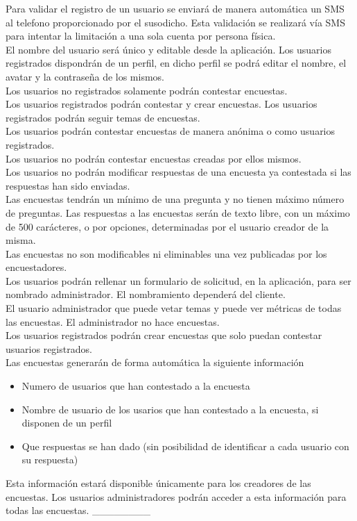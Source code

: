 \documentclass[a4paper,11pt]{report}
\begin{document}
	Para validar el registro de un usuario se enviará de manera automática un SMS al telefono proporcionado por el susodicho. Esta validación se realizará vía SMS para intentar la limitación a una sola cuenta por persona física.
	\\
	El nombre del usuario será único y editable desde la aplicación. Los usuarios registrados dispondrán de un perfil, en dicho perfil se podrá editar el nombre, el avatar y la contraseña de los mismos. 
	\\
	Los usuarios no registrados solamente podrán contestar encuestas. 
	\\
	Los usuarios registrados podrán contestar y crear encuestas. Los usuarios registrados podrán seguir temas de encuestas.
	\\
	Los usuarios podrán contestar encuestas de manera anónima o como usuarios registrados.
	\\
	Los usuarios no podrán contestar encuestas creadas por ellos mismos.
	\\
	Los usuarios no podrán modificar respuestas de una encuesta ya contestada si las respuestas han sido enviadas.
	\\
	Las encuestas tendrán un mínimo de una pregunta y no tienen máximo número de preguntas. Las respuestas a las encuestas serán de texto libre, con un máximo de 500 carácteres, o por opciones, determinadas por el usuario creador de la misma.
	\\
	Las encuestas no son modificables ni eliminables una vez publicadas por los encuestadores.
	\\
	Los usuarios podrán rellenar un formulario de solicitud, en la aplicación, para ser nombrado administrador. El nombramiento dependerá del cliente.
	\\
	El usuario administrador que puede vetar temas y puede ver métricas de todas las encuestas. El administrador no hace encuestas.
	\\
	Los usuarios registrados podrán crear encuestas que solo puedan contestar usuarios registrados.
	\\
	Las encuestas generarán de forma automática la siguiente información
	\begin{itemize}
		\item Numero de usuarios que han contestado a la encuesta
		\item Nombre de usuario de los usarios que han contestado a la encuesta, si disponen de un perfil
		\item Que respuestas se han dado (sin posibilidad de identificar a cada usuario con su respuesta)
	\end{itemize}
	Esta información estará disponible únicamente para los creadores de las encuestas. Los usuarios administradores podrán acceder a esta información para todas las encuestas.
	\_\_\_\_\_\_\_\_
	
\end{document}
